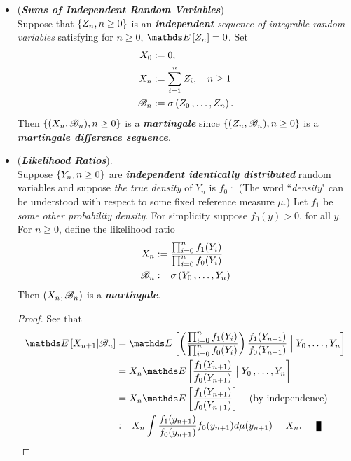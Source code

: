 \documentclass[11pt]{article}
\begin{document}
\begin{itemize}
\item \begin{example}(\emph{\textbf{Sums of Independent Random Variables}}) \\
Suppose that $\left\{Z_n, n \ge 0\right\}$ is an \emph{\textbf{independent} sequence of integrable random variables} satisfying for $n \ge 0$, 
$\E{}{Z_n} = 0$.  Set
\begin{align*}
X_0 &:= 0,\\
X_n &:= \sum_{i=1}^{n}Z_i, \quad n \ge 1 \\
{\mathscr B}_n &:= \sigma\left(Z_0 \,{,}\ldots{,}\, Z_n\right).
\end{align*} Then $\left\{(X_n, {\mathscr B}_n), n \ge 0\right\}$ is a \emph{\textbf{martingale}} since $\left\{(Z_n, {\mathscr B}_n), n \ge 0\right\}$ is a \emph{\textbf{martingale difference sequence}}.
\end{example}


\item \begin{example} (\emph{\textbf{Likelihood Ratios}}).\\ 
Suppose $\left\{Y_n, n \ge 0\right\}$ are \emph{\textbf{independent identically distributed}} random variables and suppose \emph{the true density} of $Y_n$ is $f_0$· (The word ``\emph{density}" can be understood with respect to some fixed reference measure $\mu$.)  Let $f_1$ be \emph{some other probability density}. For simplicity suppose $f_0(y) > 0$, for all $y$.  For $n \ge 0$, define the likelihood ratio
\begin{align*}
X_n &:= \frac{\prod_{i=0}^{n}f_1(Y_i)}{\prod_{i=0}^{n}f_0(Y_i)}\\
{\mathscr B}_n &:= \sigma\left(Y_0 \,{,}\ldots{,}\, Y_n\right)
\end{align*} Then $(X_n, {\mathscr B}_n)$ is a \emph{\textbf{martingale}}.
\end{example}
\begin{proof}
See that
\begin{align*}
\E{}{X_{n+1} | \srB_n} &= \E{}{ \paren{\frac{\prod_{i=0}^{n}f_1(Y_i)}{\prod_{i=0}^{n}f_0(Y_i)}}\frac{f_1(Y_{n+1})}{f_0(Y_{n+1})} \;  \Big| \; Y_0 \xdotx{,} Y_{n}}\\
&= X_n \E{}{\frac{f_1(Y_{n+1})}{f_0(Y_{n+1})} \;  \big| \; Y_0 \xdotx{,} Y_{n}} \\
&= X_n \E{}{\frac{f_1(Y_{n+1})}{f_0(Y_{n+1})}} \quad (\text{by independence})\\
&:= X_n \int \frac{f_1(y_{n+1})}{f_0(y_{n+1})} f_0(y_{n+1}) d\mu(y_{n+1}) = X_n. \qed
\end{align*}
\end{proof}
\end{itemize}
\end{document}
